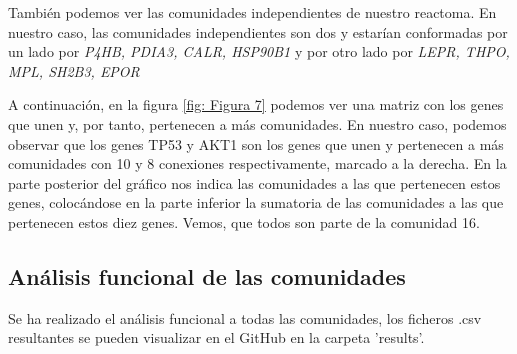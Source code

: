 \begin{spacing}{1}
También podemos ver las comunidades independientes de nuestro reactoma. En nuestro caso, las comunidades independientes son dos y estarían conformadas por un lado por \textit{P4HB, PDIA3, CALR, HSP90B1} y por otro lado por \textit{LEPR, THPO, MPL, SH2B3, EPOR}
\end{spacing}


\begin{spacing}{1}
	A continuación, en la figura \ref{fig: Figura 7} podemos ver una matriz con los genes que unen y, por tanto, pertenecen a más comunidades. En nuestro caso, podemos observar que los genes TP53 y AKT1 son los genes que unen y pertenecen a más comunidades con 10 y 8 conexiones respectivamente, marcado a la derecha. En la parte posterior del gráfico nos indica las comunidades a las que pertenecen estos genes, colocándose en la parte inferior la sumatoria de las comunidades a las que pertenecen estos diez genes. Vemos, que todos son parte de la comunidad 16.
\end{spacing}



\begin{minipage}{\linewidth}
	\label{fig: Figura 7}
\end{minipage}



\subsection{Análisis funcional de las comunidades}
Se ha realizado el análisis funcional a todas las comunidades, los ficheros .csv resultantes se pueden visualizar en el GitHub en la carpeta 'results'.

